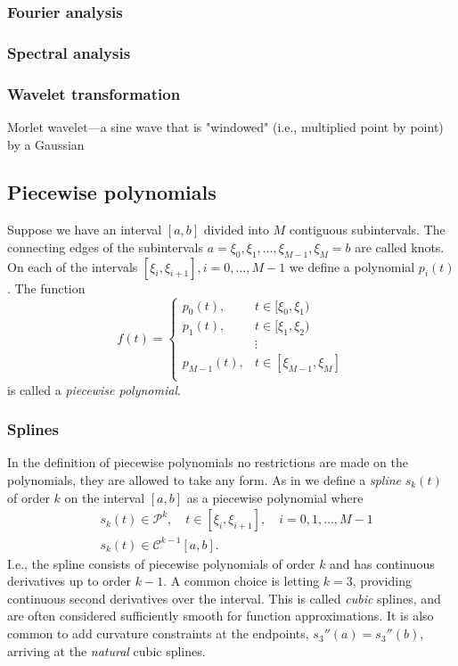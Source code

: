 \documentclass{article}
\theoremstyle{plain}
\theoremstyle{definition}
\theoremstyle{remark}
\begin{document}
\subsubsection{Fourier analysis}
\subsubsection{Spectral analysis}
\subsubsection{Wavelet transformation}
Morlet wavelet—a sine wave that is "windowed" (i.e., multiplied point by point) by a Gaussian

\subsection{Piecewise polynomials}
Suppose we have an interval $[a,b]$ divided into $M$ contiguous subintervals.
The connecting edges of the subintervals $a = \xi_0, \xi_1, \hdots, \xi_{M - 1}, \xi_{M} = b$ are called knots.
On each of the intervals $[\xi_i, \xi_{i+1}], i = 0, \hdots, M-1$ we define a polynomial $p_i (t)$.
The function
\begin{equation*}
        f(t) = 
                \begin{cases}
                        p_0(t), &  t \in [\xi_0, \xi_{1}) \\
                        p_1(t), & t \in [\xi_1, \xi_2)  \\
                        & \vdots \\
                        p_{M-1}(t), & t \in [\xi_{M-1}, \xi_{M}]  \\
                \end{cases}
\end{equation*}
is called a \textit{piecewise polynomial}.


\subsubsection{Splines}
In the definition of piecewise polynomials no restrictions are made on the polynomials, they are allowed to take any form.
As in \cite{quarteroni} we define a \textit{spline} $s_k(t)$ of order $k$ on the interval $[a,b]$ as a piecewise polynomial where
\begin{align*}
        &s_k(t) \in \mathcal{P}^k , \quad t \in [\xi_i, \xi_{i+1}],\quad i = 0, 1, \hdots, M-1 \\
        &s_k(t) \in \mathcal{C}^{k - 1}[a, b].
\end{align*}
I.e., the spline consists of piecewise polynomials of order $k$ and has continuous derivatives up to order $k - 1$.
A common choice is letting $k = 3$, providing continuous second derivatives over the interval.
This is called \textit{cubic} splines, and are often considered sufficiently smooth for function approximations.
It is also common to add curvature constraints at the endpoints, $s_3''(a) = s_3''(b)$, arriving at the \textit{natural} cubic splines.
\end{document}
